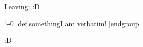 \documentclass{article}
\begin{document}
\begin{scontents}[store-env=another]
Leaving:
\aftergroup\stop :D
\end{scontents}

\begin{scontents}[store-env=test]
\begingroup
  \catcode`\|=0
  |def|something{I am verbatim!}
|endgroup
\something
\end{scontents}

\begin{scontents}[store-env=test]
\hello :D
\end{scontents}



\end{document}
